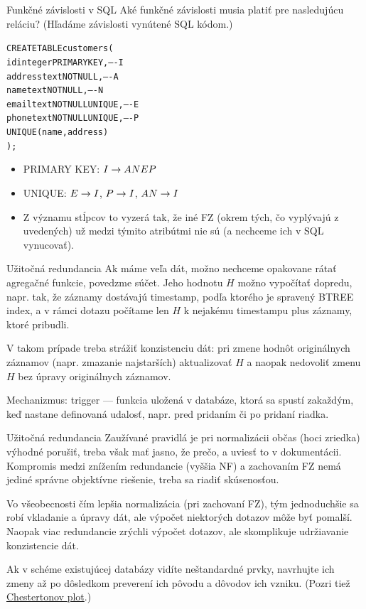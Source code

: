 \documentclass[12pt]{beamer}
\begin{document}
\begin{frame}[fragile]{Funkčné závislosti v SQL}
Aké funkčné závislosti musia platiť pre nasledujúcu reláciu? (Hľadáme závislosti vynútené SQL kódom.)
\begin{alltt}
    CREATE TABLE customers (
        id        integer PRIMARY KEY,     ---- I
        address   text NOT NULL,           ---- A
        name      text NOT NULL,           ---- N
        email     text NOT NULL UNIQUE,    ---- E
        phone     text NOT NULL UNIQUE,    ---- P
        UNIQUE(name, address)
    );
\end{alltt}
\pause
\begin{itemize}
\item PRIMARY KEY: $I\rightarrow ANEP$
\item UNIQUE: $E\rightarrow I$, $P\rightarrow I$, $AN\rightarrow I$
\item Z významu stĺpcov to vyzerá tak, že iné FZ (okrem tých, čo vyplývajú z uvedených) už medzi týmito atribútmi nie sú (a nechceme ich v SQL vynucovať).
\end{itemize}
\end{frame}


\begin{frame}{Užitočná redundancia}
Ak máme veľa dát, možno nechceme opakovane rátať agregačné funkcie, povedzme súčet.
Jeho hodnotu $H$ možno vypočítať dopredu, napr. tak, že záznamy dostávajú timestamp,
podľa ktorého je spravený BTREE index, a v rámci dotazu počítame
len $H$ k nejakému timestampu plus záznamy, ktoré pribudli.

\bigskip
V takom prípade treba strážiť konzistenciu dát: pri zmene hodnôt originálnych záznamov
(napr. zmazanie najstarších) aktualizovať $H$ a naopak nedovoliť zmenu $H$ bez úpravy originálnych záznamov.

\bigskip
Mechanizmus: \alert{trigger} --- funkcia uložená v databáze, ktorá sa spustí zakaždým,
keď nastane definovaná udalosť, napr. pred pridaním či po pridaní riadka.
\end{frame}

\begin{frame}{Užitočná redundancia}
Zaužívané pravidlá je pri normalizácii občas (hoci zriedka) výhodné porušiť,
treba však mať jasno, že prečo, a uviesť to v dokumentácii.
Kompromis medzi znížením redundancie (vyššia NF) a zachovaním FZ nemá
jediné správne objektívne riešenie, treba sa riadiť skúsenosťou.
\bigskip

Vo všeobecnosti čím lepšia normalizácia (pri zachovaní FZ),
tým jednoduchšie sa robí vkladanie a úpravy dát, ale výpočet niektorých dotazov môže byť pomalší.
Naopak viac redundancie zrýchli výpočet dotazov, ale skomplikuje udržiavanie konzistencie dát.

Ak v schéme existujúcej databázy vidíte neštandardné prvky,
navrhujte ich zmeny až po dôsledkom preverení ich pôvodu a dôvodov ich vzniku.
(Pozri tiež \href{https://fs.blog/chestertons-fence/}{Chestertonov plot}.)
\end{frame}
\end{document}
